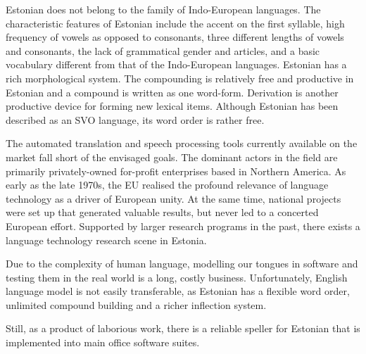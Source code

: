 \documentclass[]{../metanetpaper}
\begin{document}
\begin{multicols}{2}
Estonian does not belong to the family of Indo-European languages. 
The characteristic features of Estonian include the accent on the ﬁrst syllable, high frequency of vowels as opposed to consonants, three different lengths of vowels and consonants, the lack of grammatical gender and articles, and a basic vocabulary different from that of the Indo-European languages. 
Estonian has a rich morphological system.
The compounding is relatively free and productive in Estonian and a compound is written as one word-form. 
Derivation is another productive device for forming new lexical items. 
Although Estonian has been described as an SVO language, its word order is rather free. 


The automated translation and speech processing tools currently available on the market fall short of the envisaged goals. The dominant actors in the field are primarily privately-owned for-profit enterprises based in Northern America. As early as the late 1970s, the EU realised the profound relevance of language technology as a driver of European unity.
At the same time, national projects were set up that generated valuable results, but never led to a concerted European effort. 
Supported by larger research programs in the past, there exists a language technology research scene in Estonia. 

Due to the complexity of human language, modelling our tongues in software and testing them in the real world is a long, costly business.
Unfortunately, English language model is not easily transferable, as Estonian has a flexible word order, unlimited compound building and a richer inflection system. 

Still, as a product of laborious work, there is a reliable speller for Estonian that is implemented into main office software suites.



\end{multicols}
\end{document}

